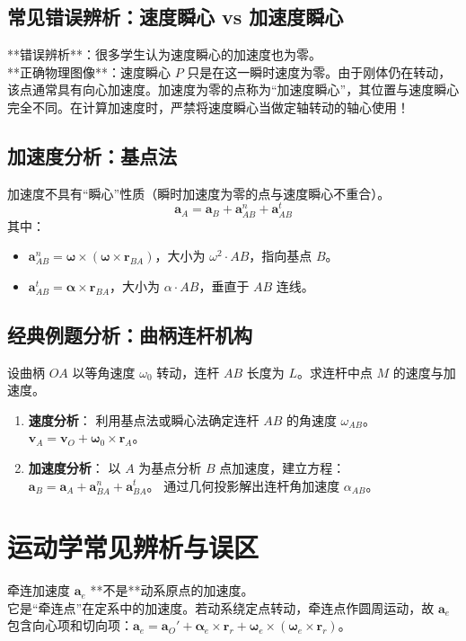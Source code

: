 \documentclass[12pt,a4paper]{article}
\newcommand{\vect}[1]{\mathbf{#1}}                   %
\begin{document}
\subsection{常见错误辨析：速度瞬心 vs 加速度瞬心}
\begin{tcolorbox}[colback=red!5!white, colframe=red!75!black, title=绝对禁止的操作]
    **错误辨析**：很多学生认为速度瞬心的加速度也为零。\\
    **正确物理图像**：速度瞬心 $P$ 只是在这一瞬时速度为零。由于刚体仍在转动，该点通常具有向心加速度。加速度为零的点称为“加速度瞬心”，其位置与速度瞬心完全不同。在计算加速度时，严禁将速度瞬心当做定轴转动的轴心使用！
\end{tcolorbox}
\subsection{加速度分析：基点法}
加速度不具有“瞬心”性质（瞬时加速度为零的点与速度瞬心不重合）。
\begin{equation}
    \vect{a}_A = \vect{a}_B + \vect{a}_{AB}^n + \vect{a}_{AB}^t
\end{equation}
其中：
\begin{itemize}
    \item $\vect{a}_{AB}^n = \vect{\omega} \times (\vect{\omega} \times \vect{r}_{BA})$，大小为 $\omega^2 \cdot AB$，指向基点 $B$。
    \item $\vect{a}_{AB}^t = \vect{\alpha} \times \vect{r}_{BA}$，大小为 $\alpha \cdot AB$，垂直于 $AB$ 连线。
\end{itemize}

\subsection{经典例题分析：曲柄连杆机构}
设曲柄 $OA$ 以等角速度 $\omega_0$ 转动，连杆 $AB$ 长度为 $L$。求连杆中点 $M$ 的速度与加速度。
\begin{enumerate}
    \item \textbf{速度分析}：
    利用基点法或瞬心法确定连杆 $AB$ 的角速度 $\omega_{AB}$。
    $\vect{v}_A = \vect{v}_O + \vect{\omega}_0 \times \vect{r}_A$。
    \item \textbf{加速度分析}：
    以 $A$ 为基点分析 $B$ 点加速度，建立方程：
    $\vect{a}_B = \vect{a}_A + \vect{a}_{BA}^n + \vect{a}_{BA}^t$。
    通过几何投影解出连杆角加速度 $\alpha_{AB}$。
\end{enumerate}

\section{运动学常见辨析与误区}
\begin{tcolorbox}[colback=orange!5!white, colframe=orange!75!black, title=辨析：牵连加速度的误区]
    牵连加速度 $\vect{a}_e$ **不是**动系原点的加速度。\\
    它是“牵连点”在定系中的加速度。若动系绕定点转动，牵连点作圆周运动，故 $\vect{a}_e$ 包含向心项和切向项：$\vect{a}_e = \vect{a}_O' + \vect{\alpha}_e \times \vect{r}_r + \vect{\omega}_e \times (\vect{\omega}_e \times \vect{r}_r)$。
\end{tcolorbox}
\end{document}
